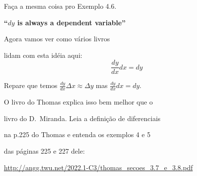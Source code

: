 \documentclass[oneside,12pt]{article}
\begin{document}
Faça a mesma coisa pro Exemplo 4.6.




\newpage


{\bf ``$dy$ is always a dependent variable''}

Agora vamos ver como vários livros

lidam com esta idéia aqui:
%
$$\frac{dy}{dx} dx = dy$$

Repare que temos $\frac{dy}{dx}Δx ≈ Δy$ mas $\frac{dy}{dx}dx = dy$.

% 
% 


O livro do Thomas explica isso bem melhor que o

livro do D.\ Miranda. Leia a definição de diferenciais

na p.225 do Thomas e entenda os exemplos 4 e 5

das páginas 225 e 227 dele:

\ssk


{\scriptsize

\url{http://angg.twu.net/2022.1-C3/thomas_secoes_3.7_e_3.8.pdf}

}

\newpage

\end{document}
